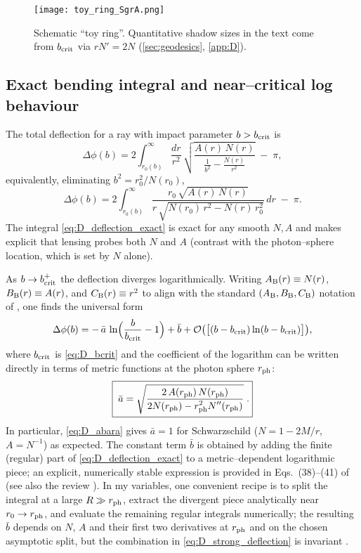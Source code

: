 \documentclass{iopjournal}
\begin{document}
\begin{figure}[t]
\centering
\texttt{[image: toy\_ring\_SgrA.png]}
\caption{Schematic “toy ring”. Quantitative shadow sizes in the text come from \(b_{\rm crit}\) via \(rN'=2N\) (\cref{sec:geodesics}, \cref{app:D}).}
\end{figure}

\subsection{Exact bending integral and near–critical log behaviour}\label{app:D2}

The total deflection for a ray with impact parameter $b>b_{\rm crit}$ is
\begin{equation}
\Delta\phi(b)
=2\int_{r_0(b)}^{\infty}\frac{dr}{r^2}\,
\sqrt{\frac{A(r)\,N(r)}{\displaystyle \frac{1}{b^{2}}-\frac{N(r)}{r^2}}}\;-\;\pi,
\label{eq:D_deflection_exact}
\end{equation}
equivalently, eliminating $b^2=r_0^2/N(r_0)$,
\begin{equation}
\Delta\phi(b)
=2\int_{r_0(b)}^{\infty}\frac{r_0\,\sqrt{A(r)\,N(r)}}{r\,\sqrt{N(r_0)\,r^{2}-N(r)\,r_0^{2}}}\,dr\;-\;\pi.
\end{equation}
The integral \eqref{eq:D_deflection_exact} is exact for any smooth $N,A$ and makes explicit that lensing probes both $N$ and $A$ (contrast with the photon–sphere location, which is set by $N$ alone).

As $b\to b_{\rm crit}^+$ the deflection diverges logarithmically. Writing $A_{\rm B}(r)\equiv N(r)$, $B_{\rm B}(r)\equiv A(r)$, and $C_{\rm B}(r)\equiv r^2$ to align with the standard $(A_{\rm B},B_{\rm B},C_{\rm B})$ notation of \cite{Bozza2002PRD}, one finds the universal form
\begin{equation}
\Delta\phi(b)=-\,\bar a\,\ln\!\Big(\frac{b}{b_{\rm crit}}-1\Big)+\bar b+\order{\big[(b-b_{\rm crit})\ln(b-b_{\rm crit})\big]},
\label{eq:D_strong_deflection}
\end{equation}
where $b_{\rm crit}$ is \eqref{eq:D_bcrit} and the coefficient of the logarithm can be written directly in terms of metric functions at the photon sphere $r_{\rm ph}$:
\begin{equation}
\boxed{\;
\bar a
=\sqrt{\frac{2\,A(r_{\rm ph})\,N(r_{\rm ph})}{\displaystyle 2N(r_{\rm ph})-r_{\rm ph}^{2}N''(r_{\rm ph})}}\;.
}
\label{eq:D_abara}
\end{equation}
In particular, \eqref{eq:D_abara} gives $\bar a=1$ for Schwarzschild ($N=1-2M/r$, $A=N^{-1}$) as expected. The constant term $\bar b$ is obtained by adding the finite (regular) part of \eqref{eq:D_deflection_exact} to a metric–dependent logarithmic piece; an explicit, numerically stable expression is provided in Eqs.~(38)–(41) of \cite{Bozza2002PRD} (see also the review \cite{Perlick2004LRR}). In my variables, one convenient recipe is to split the integral at a large $R\gg r_{\rm ph}$, extract the divergent piece analytically near $r_0\to r_{\rm ph}$, and evaluate the remaining regular integrals numerically; the resulting $\bar b$ depends on $N$, $A$ and their first two derivatives at $r_{\rm ph}$ and on the chosen asymptotic split, but the combination in \eqref{eq:D_strong_deflection} is invariant \cite{Bozza2002PRD,VirbhadraEllis2000}.
\end{document}
